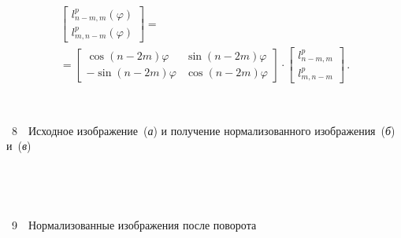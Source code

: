 \begin{multicols}{2}
\noindent
\begin{multline*}
\begin{bmatrix}
l^p_{n-m,m}(\varphi)\\[6pt]
l^p_{m,n-m}(\varphi)
\end{bmatrix}={}\\
{}=
\begin{bmatrix}
\cos(n-2m)\varphi & \sin(n-2m)\varphi\\
-\sin(n-2m)\varphi & \cos(n-2m)\varphi
\end{bmatrix}
\cdot 
\begin{bmatrix}
l^p_{n-m,m}\\
l^p_{m,n-m}
\end{bmatrix}\,.
\end{multline*}
\begin{center} %
\vspace*{-3pt}
\mbox{%
\epsfxsize=76.075mm
}
\end{center}
\vspace*{-6pt}
{{\figurename~8}\ \ \small{Исходное изображение~(\textit{а}) и получение нормализованного изображения~(\textit{б}) и~(\textit{в})}}

\setcounter{figure}{9}
\begin{figure*} %
\vspace*{1pt}
\begin{center}
\mbox{%
\epsfxsize=112.131mm
}
\end{center}
\vspace*{-6pt}
\end{figure*}





\begin{center} %
\mbox{%
\epsfxsize=78mm
}
\end{center}
\vspace*{-6pt}
{{\figurename~9}\ \ \small{Нормализованные изображения после поворота}}
\pagebreak


\end{multicols}
